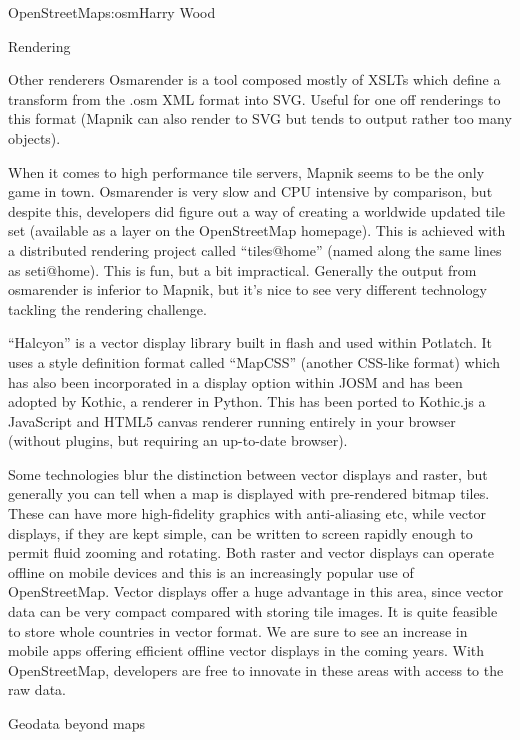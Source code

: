\begin{aosachapter}{OpenStreetMap}{s:osm}{Harry Wood}
\begin{aosasect1}{Rendering}
\begin{aosasect2}{Other renderers}
Osmarender is a tool composed mostly of XSLTs which define a transform
from the .osm XML format into SVG. Useful for one off renderings to
this format (Mapnik can also render to SVG but tends to output rather
too many objects).

When it comes to high performance tile servers, Mapnik seems to be the
only game in town. Osmarender is very slow and CPU intensive by
comparison, but despite this, developers did figure out a way of
creating a worldwide updated tile set (available as a layer on the
OpenStreetMap homepage). This is achieved with a distributed rendering
project called ``tiles@home'' (named along the same lines as
seti@home). This is fun, but a bit impractical. Generally the output
from osmarender is inferior to Mapnik, but it's nice to see very
different technology tackling the rendering challenge.

``Halcyon'' is a vector display library built in flash and used within
Potlatch. It uses a style definition format called ``MapCSS'' (another
CSS-like format) which has also been incorporated in a display option
within JOSM and has been adopted by Kothic, a renderer in Python. This
has been ported to Kothic.js a JavaScript and HTML5 canvas renderer
running entirely in your browser (without plugins, but requiring an
up-to-date browser).

Some technologies blur the distinction between vector displays and
raster, but generally you can tell when a map is displayed with
pre-rendered bitmap tiles. These can have more high-fidelity graphics
with anti-aliasing etc, while vector displays, if they are kept
simple, can be written to screen rapidly enough to permit fluid
zooming and rotating. Both raster and vector displays can operate
offline on mobile devices and this is an increasingly popular use of
OpenStreetMap. Vector displays offer a huge advantage in this area,
since vector data can be very compact compared with storing tile
images. It is quite feasible to store whole countries in vector
format. We are sure to see an increase in mobile apps offering
efficient offline vector displays in the coming years. With
OpenStreetMap, developers are free to innovate in these areas with
access to the raw data.

\end{aosasect2}

\end{aosasect1}

\begin{aosasect1}{Geodata beyond maps}


\end{aosasect1}
\end{aosachapter}
